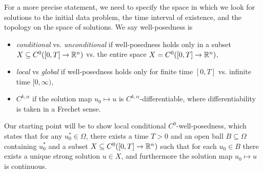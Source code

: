 For a more precise statement, we need to specify the space in which we look for solutions to the initial data problem, the time interval of existence, and the topology on the space of solutions. We say well-posedness is
	\begin{itemize}
		\item \emph{conditional} vs. \emph{unconditional} if well-posedness holds only in a subset $X \subseteq C^0 ([0, T] \to \mathbb R^n)$ vs. the entire space $X = C^0 ([0, T] \to \mathbb R^n)$, 
		
		\item \emph{local} vs \emph{global} if well-posedness holds only for finite time $[0, T]$ vs. infinite time $[0, \infty)$, 
		
		\item $C^{k, \alpha}$ if the solution map $u_0 \mapsto u$ is $C^{k, \alpha}$-differentiable, where differentiability is taken in a Frechet sense. 
	\end{itemize}
Our starting point will be to show local conditional $C^0$-well-posedness, which states that	for any $u_0^* \in \Omega$, there exists a time $T > 0$ and an open ball $B \subseteq \Omega$ containing $u_0^*$ and a subset $X \subseteq C^0([0, T] \to \mathbb R^n)$ such that for each $u_0 \in B$ there exists a unique strong solution $u \in X$, and furthermore the solution map $u_0 \mapsto u$ is continuous. 
